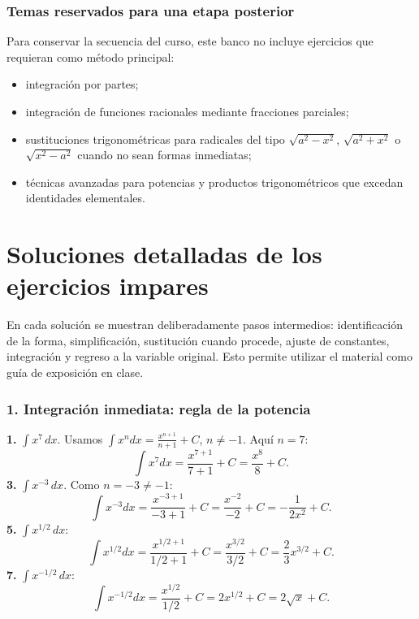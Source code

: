 \documentclass[11pt]{article}
\begin{document}
\section*{Temas reservados para una etapa posterior}
Para conservar la secuencia del curso, este banco no incluye ejercicios que requieran como método principal:
\begin{itemize}
\item integración por partes;
\item integración de funciones racionales mediante fracciones parciales;
\item sustituciones trigonométricas para radicales del tipo $\sqrt{a^2-x^2}$, $\sqrt{a^2+x^2}$ o $\sqrt{x^2-a^2}$ cuando no sean formas inmediatas;
\item técnicas avanzadas para potencias y productos trigonométricos que excedan identidades elementales.
\end{itemize}


\clearpage
\part*{Soluciones detalladas de los ejercicios impares}

En cada solución se muestran deliberadamente pasos intermedios: identificación de la forma, simplificación, sustitución cuando procede, ajuste de constantes, integración y regreso a la variable original. Esto permite utilizar el material como guía de exposición en clase.

\section*{1. Integración inmediata: regla de la potencia}
\textbf{1.} $\displaystyle\int x^7\,dx$. Usamos $\int x^n dx=\frac{x^{n+1}}{n+1}+C$, $n\neq-1$. Aquí $n=7$:
\[\int x^7dx=\frac{x^{7+1}}{7+1}+C=\frac{x^8}{8}+C.\]
\textbf{3.} $\displaystyle\int x^{-3}\,dx$. Como $n=-3\neq-1$:
\[\int x^{-3}dx=\frac{x^{-3+1}}{-3+1}+C=\frac{x^{-2}}{-2}+C=-\frac{1}{2x^2}+C.\]
\textbf{5.} $\displaystyle\int x^{1/2}\,dx$:
\[\int x^{1/2}dx=\frac{x^{1/2+1}}{1/2+1}+C=\frac{x^{3/2}}{3/2}+C=\frac23x^{3/2}+C.\]
\textbf{7.} $\displaystyle\int x^{-1/2}\,dx$:
\[\int x^{-1/2}dx=\frac{x^{1/2}}{1/2}+C=2x^{1/2}+C=2\sqrt{x}+C.\]
\end{document}
